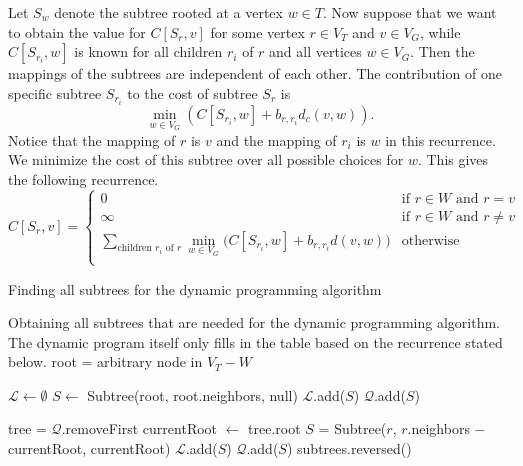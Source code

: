 Let $S_w$ denote the subtree rooted at a vertex $w \in T$.
Now suppose that we want to obtain the value for $C[S_r, v]$ for some vertex $r \in V_T$ and $v \in V_G$, while $C[S_{r_i}, w]$ is known for all children $r_i$ of $r$ and all vertices $w \in V_G$.
Then the mappings of the subtrees are independent of each other.
The contribution of one specific subtree $S_{r_i}$ to the cost of subtree $S_r$ is
\[
    \min_{w \in V_G} \left( C[S_{r_i}, w] + b_{r, r_i} d_c(v, w) \right).
\]
Notice that the mapping of $r$ is $v$ and the mapping of $r_i$ is $w$ in this recurrence.
We minimize the cost of this subtree over all possible choices for $w$.
This gives the following recurrence.
\[
    C[S_r, v] = \begin{cases}
                  0 &\text{if $r \in W$ and $r = v$} \\
                  \infty &\text{if $r \in W$ and $r \neq v$} \\
                  \displaystyle \sum_{\text{children $r_i$ of $r$}} \min_{w \in V_G} \Big( C[S_{r_i}, w] + b_{r, r_i} d(v, w) \Big) &\text{otherwise} \\
    \end{cases}
\]

\begin{algorithm}
    \caption{Finding all subtrees for the dynamic programming algorithm}
    \label{alg:subtrees}
    \begin{algorithmic}[1]
        \Statex Obtaining all subtrees that are needed for the dynamic programming algorithm.
        The dynamic program itself only fills in the table based on the recurrence stated below.
            \State root = arbitrary node in $V_T - W$

            \State $\mathcal L \gets \emptyset$
            \State $S \gets$ Subtree(root, root.neighbors, null) 
            \State $\mathcal L$.add($S$)
            \State $\mathcal Q$.add($S$)

                \State tree = $\mathcal Q$.removeFirst
                \State currentRoot $\gets$ tree.root
                    \State $S$ = Subtree($r$, $r$.neighbors $-$ currentRoot, currentRoot)
                    \State $\mathcal L$.add($S$)
                    \State $\mathcal Q$.add($S$)
                \EndFor
            \EndWhile
            \State \Return subtrees.reversed()
        \EndProcedure
    \end{algorithmic}
\end{algorithm}

